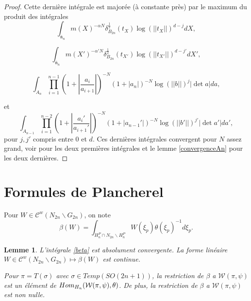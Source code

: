 \documentclass{amsart}
\newtheorem{lemme}{Lemme}[section]
\DeclareMathOperator{\Hom}{\mathnormal{Hom}}
\begin{document}
\begin{proof}
Cette dernière intégrale est majorée (à constante près) par le maximum du produit des intégrales
 \begin{equation}
 \int_{\bar{\mathfrak{n}}_n} m(X)^{-\alpha N} \delta^{\frac{1}{2}}_{B_{2n}}(t_X)\log(||t_X||)^{d-j} dX,
 \end{equation}
 
 \begin{equation}
 \int_{\bar{\mathfrak{n}}_n} m(X')^{-\alpha' N} \delta^{\frac{1}{2}}_{B_{2n}}(t_{X'})\log(||t_{X'}||)^{d-j'} dX',
 \end{equation}
 
 \begin{equation}
 \int_{A_n}  \prod_{i=1}^{n-1} (1+ |\frac{a_i}{a_{i+1}}|)^{-N} (1+|a_n|)^{-N}\log(||b||)^j|\det a| da,
 \end{equation}
 
 et
 \begin{equation}
 \int_{A_{n-1}}  \prod_{i=1}^{n-2} (1+ |\frac{a_i'}{a_{i+1}'}|)^{-N} (1+|a_{n-1}'|)^{-N}\log(||b'||)^{j'}|\det a'|da',
 \end{equation}
 pour $j, j'$ compris entre $0$ et $d$. Ces dernières intégrales convergent pour $N$ assez grand, voir \cite[proposition 5.5]{jacquet-shalika} pour les deux premières intégrales et le lemme \ref{convergenceAn} pour les deux dernières.

 \end{proof}
 
 
 \section{Formules de Plancherel}
 
 Pour $W \in \mathcal{C}^w(N_{2n} \backslash G_{2n})$, on note
\begin{equation}
\label{beta}
\beta(W) = \int_{H^P_n \cap N_{2n} \backslash H^P_n} W(\xi_p) \theta(\xi_p)^{-1} d\xi_p.
\end{equation}

\begin{lemme}
\label{lemmebeta}
L'intégrale \ref{beta} est absolument convergente. La forme linéaire $W \in \mathcal{C}^w(N_{2n} \backslash G_{2n}) \mapsto \beta(W)$ est continue.

Pour $\pi = T(\sigma)$ avec $\sigma \in Temp(SO(2n+1))$, la restriction de $\beta$ a $\mathcal{W}(\pi, \psi)$ est un élément de $\Hom_{H_n}(\mathcal{W}(\pi, \psi), \theta)$. De plus, la restriction de $\beta$ a $\mathcal{W}(\pi, \psi)$ est non nulle.
\end{lemme}
\end{document}
